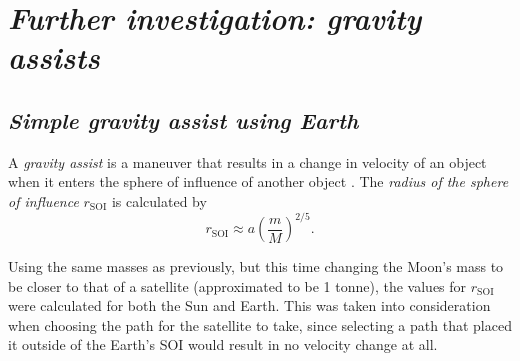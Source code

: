 \documentclass[12pt, english]{report}
\begin{document}
\section{\textsl{Further investigation: gravity assists}}
\subsection{\textsl{Simple gravity assist using Earth}}

\normalsize{\noindent A \emph{gravity assist} is a maneuver that results in a change in velocity of an object when it enters the sphere of influence of another object \cite{noauthor_basics_nodate}. The \emph{radius of the sphere of influence} $r_{\mathrm{SOI}}$  \cite{noauthor_sphere_nodate} is calculated by
\begin{equation}
    r_{\mathrm{SOI}} \approx a\left( \frac{m}{M} \right)^{2/5}.
\end{equation}

\noindent Using the same masses as previously, but this time changing the Moon's mass to be closer to that of a satellite (approximated to be 1 tonne), the values for $r_{\mathrm{SOI}}$ were calculated for both the Sun and Earth. This was taken into consideration when choosing the path for the satellite to take, since selecting a path that placed it outside of the Earth's SOI would result in no velocity change at all. 

}
\end{document}
